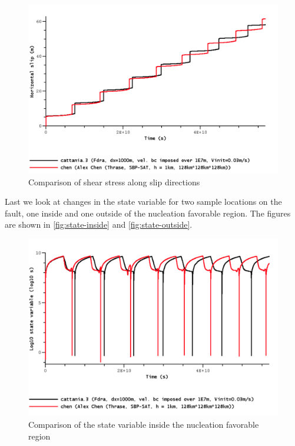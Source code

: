 \begin{figure}
    \centering
    \includegraphics[width=\linewidth]{figures/sample-slip-2.png}
    \caption{Comparison of shear stress along slip directions}
    \label{fig:bp5-slip2}
\end{figure}

Last we look at changes in the state variable for two sample locations on the fault, one inside and one outside of the nucleation favorable region. The figures are shown in \autoref{fig:state-inside} and \autoref{fig:state-outside}. 
\begin{figure}
    \centering
    \includegraphics[width=\linewidth]{figures/state-variable-nucleation.png}
    \caption{Comparison of the state variable inside the nucleation favorable region}
    \label{fig:state-inside}
\end{figure}

